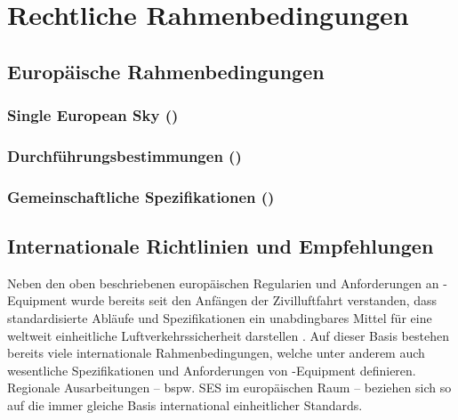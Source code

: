 \chapter{Rechtliche Rahmenbedingungen}

        
\section{Europäische Rahmenbedingungen}
\subsection{Single European Sky ()}
    \label{ch:er}
    
    
\subsection{Durchführungsbestimmungen ()}
    \label{ch:ir}
    
    \pagebreak

\subsection{Gemeinschaftliche Spezifikationen ()}
    \label{ch:cs}
    
    \pagebreak

\section{Internationale Richtlinien und Empfehlungen}
    
    Neben den oben beschriebenen europäischen Regularien und Anforderungen an \atmans-Equipment wurde bereits seit den Anfängen der Zivilluftfahrt verstanden, dass standardisierte Abläufe und Spezifikationen ein unabdingbares Mittel für eine weltweit einheitliche Luftverkehrssicherheit darstellen
    \cite[156]{eu_icao_milde}.
    Auf dieser Basis bestehen bereits viele internationale Rahmenbedingungen, welche unter anderem auch wesentliche Spezifikationen und Anforderungen von \atmans-Equipment definieren.
    Regionale Ausarbeitungen -- bspw. \ac{SES} im europäischen Raum -- beziehen sich so auf die immer gleiche Basis international einheitlicher Standards.

